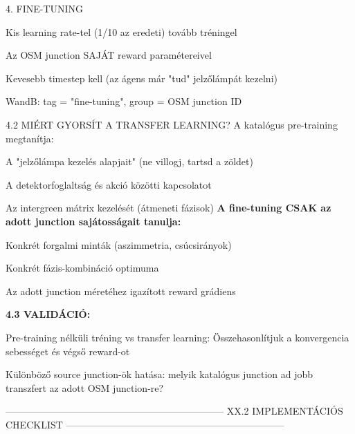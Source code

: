\documentclass[11pt,a4paper]{article}
\begin{document}
4. FINE-TUNING
\par\noindent\hspace*{1em}\textbullet{} Kis learning rate-tel (1/10 az eredeti) tovább tréningel
\par\noindent\hspace*{1em}\textbullet{} Az OSM junction SAJÁT reward paramétereivel
\par\noindent\hspace*{1em}\textbullet{} Kevesebb timestep kell (az ágens már "tud" jelzőlámpát kezelni)
\par\noindent\hspace*{1em}\textbullet{} WandB: tag = "fine-tuning", group = OSM junction ID

4.2 MIÉRT GYORSÍT A TRANSFER LEARNING?
A katalógus pre-training megtanítja:
\par\noindent\hspace*{1em}\textbullet{} A "jelzőlámpa kezelés alapjait" (ne villogj, tartsd a zöldet)
\par\noindent\hspace*{1em}\textbullet{} A detektorfoglaltság és akció közötti kapcsolatot
\par\noindent\hspace*{1em}\textbullet{} Az intergreen mátrix kezelését (átmeneti fázisok)
\textbf{A fine-tuning CSAK az adott junction sajátosságait tanulja:}
\par\noindent\hspace*{1em}\textbullet{} Konkrét forgalmi minták (aszimmetria, csúcsirányok)
\par\noindent\hspace*{1em}\textbullet{} Konkrét fázis-kombináció optimuma
\par\noindent\hspace*{1em}\textbullet{} Az adott junction méretéhez igazított reward grádiens

\textbf{4.3 VALIDÁCIÓ:}
\par\noindent\hspace*{1em}\textbullet{} Pre-training nélküli tréning vs transfer learning:
Összehasonlítjuk a konvergencia sebességet és végső reward-ot
\par\noindent\hspace*{1em}\textbullet{} Különböző source junction-ök hatása: melyik katalógus junction
ad jobb transzfert az adott OSM junction-re?

--------------------------------------------------------------------
XX.2 IMPLEMENTÁCIÓS CHECKLIST
--------------------------------------------------------------------
\end{document}
